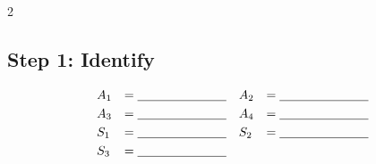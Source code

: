 \begin{multicols}{2}
		\subsection*{Step 1: Identify}
		\[
		\begin{array}{llll}
			A_1 &= \underline{\hspace{2.5cm}} &
			A_2 &= \underline{\hspace{2.5cm}} \\[3pt]
			A_3 &= \underline{\hspace{2.5cm}} &
			A_4 &= \underline{\hspace{2.5cm}} \\[3pt]
			S_1 &= \underline{\hspace{2.5cm}} &
			S_2 &= \underline{\hspace{2.5cm}} \\[3pt]
			S_3 &= \underline{\hspace{2.5cm}} &
			&
		\end{array}
		\]

\end{multicols}
